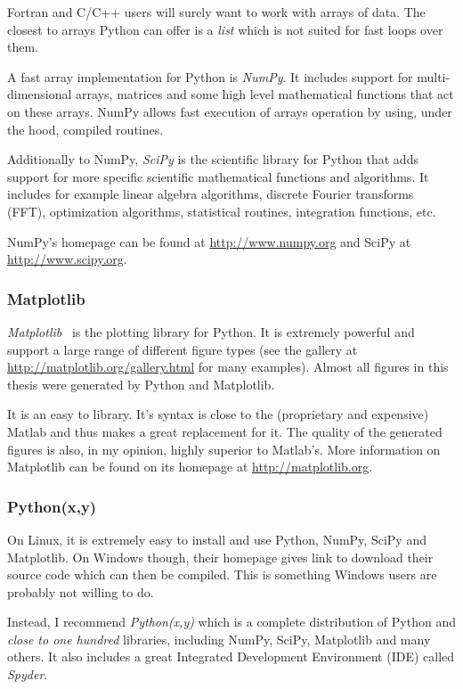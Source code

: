 Fortran and C/C++ users will surely want to work with arrays of data. The closest
to arrays Python can offer is a \textit{list} which is not suited for fast
loops over them.

A fast array implementation for Python is \textit{NumPy}. It includes support
for multi-dimensional arrays, matrices and some high level mathematical functions
that act on these arrays. NumPy allows fast execution of arrays operation by
using, under the hood, compiled routines.

Additionally to NumPy, \textit{SciPy} is the scientific library for Python that
adds support for more specific scientific mathematical functions and algorithms.
It includes for example linear algebra algorithms, discrete Fourier transforms
(FFT), optimization algorithms, statistical routines, integration functions, etc.

NumPy's homepage can be found at \url{http://www.numpy.org} and SciPy at\\
\url{http://www.scipy.org}.


\subsubsection*{Matplotlib}

\textit{Matplotlib}~\cite{matplotlib} is the plotting library for Python. It is extremely powerful
and support a large range of different figure types (see the gallery
at \url{http://matplotlib.org/gallery.html} for
many examples). Almost all figures in
this thesis were generated by Python and Matplotlib.

It is an easy to library. It's syntax is close to the (proprietary and expensive)
Matlab and thus makes a great replacement for it. The quality of the generated
figures is also, in my opinion, highly superior to Matlab's.
More information on Matplotlib can be found on its homepage at
\url{http://matplotlib.org}.


\subsubsection*{Python(x,y)}

On Linux, it is extremely easy to install and use Python, NumPy, SciPy and
Matplotlib. On Windows though, their homepage gives link to download their
source code which can then be compiled. This is something Windows users are
probably not willing to do.

Instead, I recommend \textit{Python(x,y)} which is a complete distribution of
Python and \textit{close to one hundred} libraries, including NumPy, SciPy,
Matplotlib and many others. It also includes a great Integrated Development
Environment (IDE) called \textit{Spyder}.

